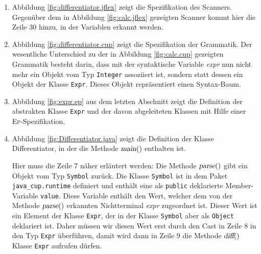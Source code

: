 \begin{enumerate}
\item Abbildung \ref{fig:differentiator.jflex} zeigt die Spezifikation des Scanners.
      Gegen\"uber dem in Abbildung \ref{fig:calc.jflex} gezeigten Scanner kommt hier die Zeile 30
      hinzu, in der Variablen erkannt werden.
\item Abbildung \ref{fig:differentiator.cup} zeigt die Spezifikation der Grammatik.
      Der wesentliche Unterschied zu der in Abbildung \ref{fig:calc.cup} gezeigten Grammatik besteht
      darin, dass mit der syntaktische Variable \textsl{expr} nun nicht mehr ein Objekt vom Typ
      \texttt{Integer} assoziiert ist, sondern statt dessen ein Objekt der Klasse \texttt{Expr}.
      Dieses Objekt repr\"asentiert einen Syntax-Baum.
\item Abbildung \ref{fig:expr.ep} aus dem letzten Abschnitt zeigt die Definition der abstrakten Klasse
      \texttt{Expr} und der davon abgeleiteten Klassen mit Hilfe einer \textsc{Ep}-Spezifikation.
\item Abbildung \ref{fig:Differentiator.java} zeigt die Definition der Klasse
      Differentiator, in der die Methode $\textsl{main}()$ enthalten ist.
  
      Hier muss die Zeile 7 n\"aher erl\"autert werden:
      Die Methode $\textsl{parse}()$ gibt ein Objekt vom Typ \texttt{Symbol} zur\"uck.  Die
      Klasse \texttt{Symbol} ist in dem Paket 
      \texttt{java\_cup.runtime} definiert und enth\"alt eine als \texttt{public} deklarierte
      Member-Variable \texttt{value}.  Diese Variable enth\"alt den Wert, welcher dem von der Methode
      $\textsl{parse}()$ erkannten Nichtterminal \textsl{expr} zugeordnet ist.  Dieser Wert ist ein
      Element der Klasse \texttt{Expr}, der in der Klasse \texttt{Symbol} aber als \texttt{Object} 
      deklariert ist.  Daher m\"ussen wir diesen Wert erst durch den Cast in Zeile 8 in den Typ 
      \texttt{Expr} \"uberf\"uhren, damit wird dann in Zeile 9 die Methode $\textsl{diff}()$  Klasse
      \texttt{Expr} aufrufen d\"urfen.
\end{enumerate}


